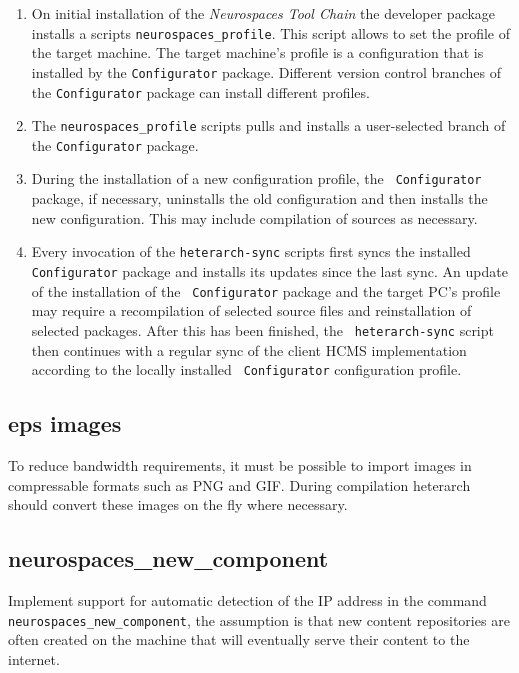 \documentclass[12pt]{article}
\begin{document}
\begin{enumerate}
\item On initial installation of the {\it Neurospaces Tool Chain} the
  developer package installs a scripts {\tt neurospaces\_profile}.
  This script allows to set the profile of the target machine.  The
  target machine's profile is a configuration that is installed by the
  {\tt Configurator} package.  Different version control branches of
  the {\tt Configurator} package can install different profiles.
\item The {\tt neurospaces\_profile} scripts pulls and installs a
  user-selected branch of the {\tt Configurator} package.
\item During the installation of a new configuration profile, the {\tt
    Configurator} package, if necessary, uninstalls the old
  configuration and then installs the new configuration.  This may
  include compilation of sources as necessary.
\item Every invocation of the {\tt heterarch-sync} scripts first syncs
  the installed {\tt Configurator} package and installs its updates
  since the last sync.  An update of the installation of the {\tt
    Configurator} package and the target PC's profile may require a
  recompilation of selected source files and reinstallation of
  selected packages.  After this has been finished, the {\tt
    heterarch-sync} script then continues with a regular sync of the
  client HCMS implementation according to the locally installed {\tt
    Configurator} configuration profile.
\end{enumerate}

\subsection{eps images}

To reduce bandwidth requirements, it must be possible to import images
in compressable formats such as PNG and GIF.  During compilation
heterarch should convert these images on the fly where necessary.


\subsection{neurospaces\_new\_component}

Implement support for automatic detection of the IP address in the
command {\tt neurospaces\_new\_component}, the assumption is that new
content repositories are often created on the machine that will
eventually serve their content to the internet.
\end{document}
